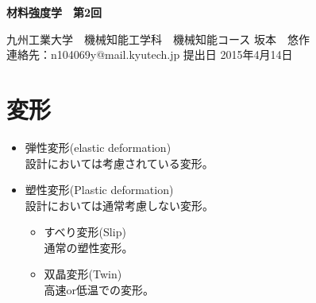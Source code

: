 \documentclass[a4j,twoside,openright,11pt]{jreport}
\begin{document}
\begin{screen}
\huge
\begin{center}
{\bf 材料強度学　第2回}\\
\end{center}

\normalsize
\begin{flushright}
九州工業大学　機械知能工学科　機械知能コース  坂本　悠作\\連絡先：n104069y@mail.kyutech.jp \hspace{0.2in}提出日 2015年4月14日
\end{flushright}
\end{screen}

\section{変形}
\begin{itemize}
\item 弾性変形(elastic deformation)\\
設計においては考慮されている変形。
\item 塑性変形(Plastic deformation)\\
設計においては通常考慮しない変形。
\begin{itemize}
\item すべり変形(Slip)\\
通常の塑性変形。
\item 双晶変形(Twin)\\
高速or低温での変形。
\end{itemize}
\end{itemize}
\end{document}
